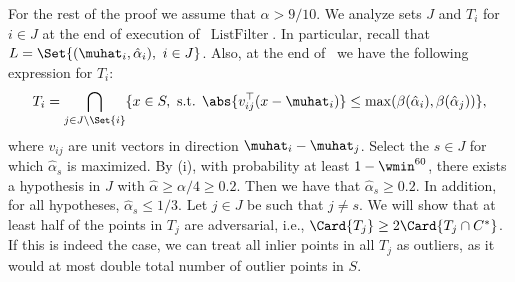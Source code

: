 \noindent
For the rest of the proof we assume that \(\alpha > 9/10\).
We analyze sets \(J\) and \(T_i\) for \(i \in J\) at the end of execution of~\(\operatorname{ListFilter}\).
In particular, recall that \(L = \Set{(\muhat_i, \hat \alpha_i),\ i \in J}\).
Also, at the end of~ we have the following expression for \(T_i\):
\begin{equation*}
    T_i = \bigcap_{j \in J \setminus \Set{i}}\{x \in S, \text{ s.t. } \abs{v_{ij}^{\top}(x - \muhat_i)} \leq \max(\beta(\hat\alpha_i), \beta(\hat\alpha_j))\},
\end{equation*}
where \(v_{ij}\) are unit vectors in direction \(\muhat_i - \muhat_j\).
Select the $s \in J$ for which $\hat\alpha_s$ is maximized.
By (i), with probability at least $1-\wmin^{60}$, there exists a hypothesis in $J$ with $\hat\alpha \geq \alpha/4 \geq 0.2$.
Then we have that $\hat\alpha_s \geq 0.2$.
In addition, for all hypotheses, $\hat\alpha_s \leq 1/3$.
Let \(j \in J\) be such that \(j \neq s\).
We will show that at least half of the points in \(T_j\) are adversarial, i.e., \(\Card{T_j} \geq 2 \Card{T_j \cap C^{\ast}}\). 
If this is indeed the case, we can treat all inlier points in all \(T_j\) as outliers, 
as it would at most double total number of outlier points in \(S\).

